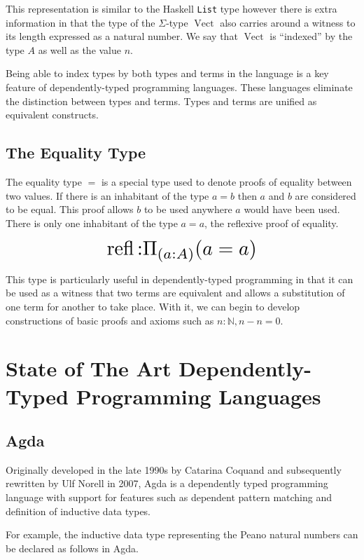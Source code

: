 \documentclass[a4paper, notitlepage]{report}
\begin{document}
This representation is similar to the Haskell \texttt{List} type however there is extra
information in that the type of the \(\Sigma\)-type \(\operatorname{Vect}\) also
carries around a witness to its length expressed as a natural number. We say
that \(\operatorname{Vect}\) is ``indexed'' by the type \(A\) as well as the value
\(n\).

Being able to index types by both types and terms in the language is a key
feature of dependently-typed programming languages. These languages eliminate
the distinction between types and terms. Types and terms are unified as
equivalent constructs.

\subsection{The Equality Type}
\label{sec:org24a77a9}
The equality type \(=\) is a special type used to denote proofs of equality
between two values. If there is an inhabitant of the type \(a \mathrel{=} b\) then
\(a\) and \(b\) are considered to be equal. This proof allows \(b\) to be used
anywhere \(a\) would have been used. There is only one inhabitant of the type \(a
\mathrel{=} a\), the reflexive proof of equality.

\[ \scalebox{2}{$\operatorname{refl} \mathbin{:} \Pi_{(a \mathbin{:} A)} (a
\mathrel{=} a)$} \]

This type is particularly useful in dependently-typed programming in that it can
be used as a witness that two terms are equivalent and allows a substitution of
one term for another to take place. With it, we can begin to develop
constructions of basic proofs and axioms such as \(n \mathbin{:} {\mathbb N}, n
\mathbin{-} n \mathrel{=} 0\).

\section{State of The Art Dependently-Typed Programming Languages}
\label{sec:orgd48829e}
\subsection{Agda}
\label{sec:org3318ebf}
Originally developed in the late 1990s by Catarina Coquand and subsequently
rewritten by Ulf Norell in 2007, Agda is a dependently typed programming
language with support for features such as dependent pattern matching and
definition of inductive data types.

For example, the inductive data type representing the Peano natural numbers can
be declared as follows in Agda.
\end{document}
